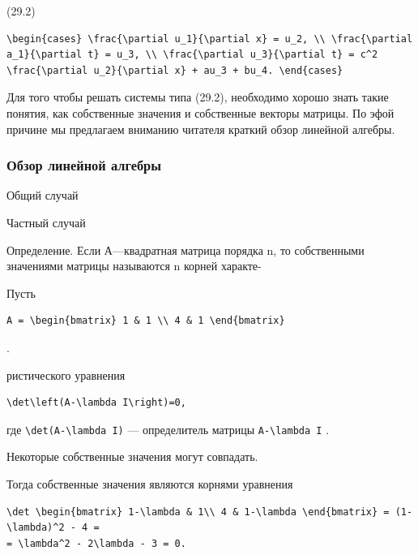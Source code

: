 \documentclass[
  ukrainian,
]{article}
\begin{document}
(29.2)

\begin{verbatim}
\begin{cases} \frac{\partial u_1}{\partial x} = u_2, \\ \frac{\partial a_1}{\partial t} = u_3, \\ \frac{\partial u_3}{\partial t} = c^2 \frac{\partial u_2}{\partial x} + au_3 + bu_4. \end{cases}
\end{verbatim}

Для того чтобы решать системы типа (29.2), необходимо хорошо знать такие
понятия, как собственные значения и собственные векторы матрицы. По эфой
причине мы предлагаем вниманию читателя краткий обзор линейной алгебры.

\subsubsection{Обзор линейной
алгебры}\label{ux43eux431ux437ux43eux440-ux43bux438ux43dux435ux439ux43dux43eux439-ux430ux43bux433ux435ux431ux440ux44b}

Общий случай

Частный случай

Определение. Если А---квадратная матрица порядка n, то собственными
значениями матрицы называются n корней характе-

Пусть

\begin{verbatim}
A = \begin{bmatrix} 1 & 1 \\ 4 & 1 \end{bmatrix}
\end{verbatim}

.

ристического уравнения

\begin{verbatim}
\det\left(A-\lambda I\right)=0,
\end{verbatim}

где \texttt{\textbackslash{}det(A-\textbackslash{}lambda\ I)} ---
определитель матрицы \texttt{A-\textbackslash{}lambda\ I} .

Некоторые собственные значения могут совпадать.

Тогда собственные значения являются корнями уравнения

\begin{verbatim}
\det \begin{bmatrix} 1-\lambda & 1\\ 4 & 1-\lambda \end{bmatrix} = (1-\lambda)^2 - 4 =
= \lambda^2 - 2\lambda - 3 = 0.
\end{verbatim}
\end{document}
